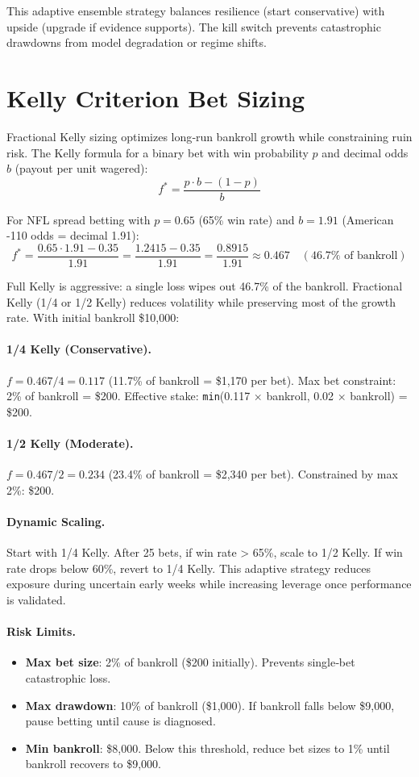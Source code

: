 This adaptive ensemble strategy balances resilience (start conservative) with upside (upgrade if evidence supports). The kill switch prevents catastrophic drawdowns from model degradation or regime shifts.

\section{Kelly Criterion Bet Sizing}
\label{sec:kelly_sizing}

Fractional Kelly sizing optimizes long‑run bankroll growth while constraining ruin risk. The Kelly formula for a binary bet with win probability $p$ and decimal odds $b$ (payout per unit wagered):
\[
f^* = \frac{p \cdot b - (1 - p)}{b}
\]

For NFL spread betting with $p = 0.65$ (65\% win rate) and $b = 1.91$ (American -110 odds = decimal 1.91):
\[
f^* = \frac{0.65 \cdot 1.91 - 0.35}{1.91} = \frac{1.2415 - 0.35}{1.91} = \frac{0.8915}{1.91} \approx 0.467 \quad (46.7\% \text{ of bankroll})
\]

Full Kelly is aggressive: a single loss wipes out 46.7\% of the bankroll. Fractional Kelly (1/4 or 1/2 Kelly) reduces volatility while preserving most of the growth rate. With initial bankroll \$10,000:

\paragraph{1/4 Kelly (Conservative).}
$f = 0.467 / 4 = 0.117$ (11.7\% of bankroll = \$1,170 per bet). Max bet constraint: 2\% of bankroll = \$200. Effective stake: \texttt{min}(0.117 × bankroll, 0.02 × bankroll) = \$200.

\paragraph{1/2 Kelly (Moderate).}
$f = 0.467 / 2 = 0.234$ (23.4\% of bankroll = \$2,340 per bet). Constrained by max 2\%: \$200.

\paragraph{Dynamic Scaling.}
Start with 1/4 Kelly. After 25 bets, if win rate > 65\%, scale to 1/2 Kelly. If win rate drops below 60\%, revert to 1/4 Kelly. This adaptive strategy reduces exposure during uncertain early weeks while increasing leverage once performance is validated.

\paragraph{Risk Limits.}
\begin{itemize}
\item \textbf{Max bet size}: 2\% of bankroll (\$200 initially). Prevents single‑bet catastrophic loss.
\item \textbf{Max drawdown}: 10\% of bankroll (\$1,000). If bankroll falls below \$9,000, pause betting until cause is diagnosed.
\item \textbf{Min bankroll}: \$8,000. Below this threshold, reduce bet sizes to 1\% until bankroll recovers to \$9,000.
\end{itemize}

